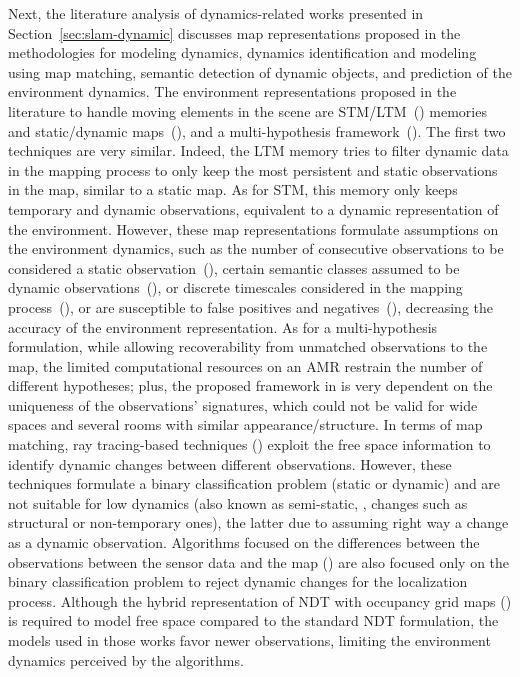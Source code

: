 Next, the literature analysis of dynamics-related works 
presented in Section~\ref{sec:slam-dynamic} discusses map representations proposed in the methodologies for modeling dynamics, dynamics identification and modeling using map matching, semantic detection of dynamic objects, and prediction of the environment dynamics.
The environment representations proposed in the literature to handle moving elements in the scene are \gls{STM}/\gls{LTM}~(\cite{dayoub-et-al:2011:013,bacca-et-al:2013:003,biber-duckett:2009:0278364908096286}) memories and static/dynamic maps~(\cite{walcott-bryant-et-al:2012:6385561,wang-et-al:2019:8793499,zhu-et-al:2021:9561584}), and a multi-hypothesis framework~(\cite{nielsen-hendeby:2022:9841255}). The first two techniques are very similar. Indeed, the \gls{LTM} memory tries to filter dynamic data in the mapping process to only keep the most persistent and static observations in the map, similar to a static map. As for \gls{STM}, this memory only keeps temporary and dynamic observations, equivalent to a dynamic representation of the environment. However, these map representations formulate assumptions on the environment dynamics, such as the number of consecutive observations to be considered a static observation~(\cite{dayoub-et-al:2011:013,bacca-et-al:2013:003}), certain semantic classes assumed to be dynamic observations~(\cite{wang-et-al:2019:8793499,zhu-et-al:2021:9561584}), or discrete timescales considered in the mapping process~(\cite{biber-duckett:2009:0278364908096286}), or are susceptible to false positives and negatives~(\cite{walcott-bryant-et-al:2012:6385561}), decreasing the accuracy of the environment representation. As for a multi-hypothesis formulation, while allowing recoverability from unmatched observations to the map, the limited computational resources on an \gls{AMR} restrain the number of different hypotheses; plus, the proposed framework in \cite{nielsen-hendeby:2022:9841255} is very dependent on the uniqueness of the observations' signatures, which could not be valid for wide spaces and several rooms with similar appearance/structure.
In terms of map matching, ray tracing-based techniques (\cite{lázaro-et-al:2018:8594310,pomerleau-et-al:2014:6907397,an-et-al:2016:0}) exploit the free space information to identify dynamic changes between different observations. However, these techniques formulate a binary classification problem (static or dynamic) and are not suitable for low dynamics (also known as semi-static, \ie, changes such as structural or non-temporary ones), the latter due to assuming right way a change as a dynamic observation. Algorithms focused on the differences between the observations between the sensor data and the map (\cite{biswas-veloso:2017:005,zhang-et-al:2019:8814347,fu-et-al:2022:3191794,boniardi-et-al:2019:003,du-et-al:2022:3028218,liu-et-al:2022:8}) are also focused only on the binary classification problem to reject dynamic changes for the localization process. Although the hybrid representation of \gls{NDT} with occupancy grid maps (\cite{einhorn-gross:2013:6698849,einhorn-gross:2015:008,saarinen-et-al:2013:0278364913499415}) is required to model free space compared to the standard \gls{NDT} formulation, the models used in those works favor newer observations, limiting the environment dynamics perceived by the algorithms.

